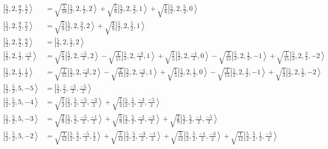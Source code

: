\documentclass{report}
\newcommand{\ket}[1]{\left| #1 \right>} %
\begin{document}
\begin{align*}
\ket{ \frac{5}{2} ,  2 ,  \frac{9}{2} ,  \frac{5}{2}  } &=  \sqrt{  \frac{5}{18}  } \ket{ \frac{5}{2} ,  2 ,  \frac{1}{2} ,  2  } + \sqrt{  \frac{5}{9}  } \ket{ \frac{5}{2} ,  2 ,  \frac{3}{2} ,  1  } + \sqrt{  \frac{1}{6}  } \ket{ \frac{5}{2} ,  2 ,  \frac{5}{2} ,  0  } \\
\ket{ \frac{5}{2} ,  2 ,  \frac{9}{2} ,  \frac{7}{2}  } &=  \sqrt{  \frac{5}{9}  } \ket{ \frac{5}{2} ,  2 ,  \frac{3}{2} ,  2  } + \sqrt{  \frac{4}{9}  } \ket{ \frac{5}{2} ,  2 ,  \frac{5}{2} ,  1  } \\
\ket{ \frac{5}{2} ,  2 ,  \frac{9}{2} ,  \frac{9}{2}  } &=  \ket{ \frac{5}{2} ,  2 ,  \frac{5}{2} ,  2  } \\
\ket{ \frac{5}{2} ,  2 ,  \frac{1}{2} ,  \frac{-1}{2}  } &=  \sqrt{  \frac{1}{3}  } \ket{ \frac{5}{2} ,  2 ,  \frac{-5}{2} ,  2  } - \sqrt{  \frac{4}{15}  } \ket{ \frac{5}{2} ,  2 ,  \frac{-3}{2} ,  1  } + \sqrt{  \frac{1}{5}  } \ket{ \frac{5}{2} ,  2 ,  \frac{-1}{2} ,  0  } - \sqrt{  \frac{2}{15}  } \ket{ \frac{5}{2} ,  2 ,  \frac{1}{2} ,  -1  } + \sqrt{  \frac{1}{15}  } \ket{ \frac{5}{2} ,  2 ,  \frac{3}{2} ,  -2  } \\
\ket{ \frac{5}{2} ,  2 ,  \frac{1}{2} ,  \frac{1}{2}  } &=  \sqrt{  \frac{1}{15}  } \ket{ \frac{5}{2} ,  2 ,  \frac{-3}{2} ,  2  } - \sqrt{  \frac{2}{15}  } \ket{ \frac{5}{2} ,  2 ,  \frac{-1}{2} ,  1  } + \sqrt{  \frac{1}{5}  } \ket{ \frac{5}{2} ,  2 ,  \frac{1}{2} ,  0  } - \sqrt{  \frac{4}{15}  } \ket{ \frac{5}{2} ,  2 ,  \frac{3}{2} ,  -1  } + \sqrt{  \frac{1}{3}  } \ket{ \frac{5}{2} ,  2 ,  \frac{5}{2} ,  -2  } \\
\ket{ \frac{5}{2} ,  \frac{5}{2} ,  5 ,  -5  } &=  \ket{ \frac{5}{2} ,  \frac{5}{2} ,  \frac{-5}{2} ,  \frac{-5}{2}  } \\
\ket{ \frac{5}{2} ,  \frac{5}{2} ,  5 ,  -4  } &=  \sqrt{  \frac{1}{2}  } \ket{ \frac{5}{2} ,  \frac{5}{2} ,  \frac{-5}{2} ,  \frac{-3}{2}  } + \sqrt{  \frac{1}{2}  } \ket{ \frac{5}{2} ,  \frac{5}{2} ,  \frac{-3}{2} ,  \frac{-5}{2}  } \\
\ket{ \frac{5}{2} ,  \frac{5}{2} ,  5 ,  -3  } &=  \sqrt{  \frac{2}{9}  } \ket{ \frac{5}{2} ,  \frac{5}{2} ,  \frac{-5}{2} ,  \frac{-1}{2}  } + \sqrt{  \frac{5}{9}  } \ket{ \frac{5}{2} ,  \frac{5}{2} ,  \frac{-3}{2} ,  \frac{-3}{2}  } + \sqrt{  \frac{2}{9}  } \ket{ \frac{5}{2} ,  \frac{5}{2} ,  \frac{-1}{2} ,  \frac{-5}{2}  } \\
\ket{ \frac{5}{2} ,  \frac{5}{2} ,  5 ,  -2  } &=  \sqrt{  \frac{1}{12}  } \ket{ \frac{5}{2} ,  \frac{5}{2} ,  \frac{-5}{2} ,  \frac{1}{2}  } + \sqrt{  \frac{5}{12}  } \ket{ \frac{5}{2} ,  \frac{5}{2} ,  \frac{-3}{2} ,  \frac{-1}{2}  } + \sqrt{  \frac{5}{12}  } \ket{ \frac{5}{2} ,  \frac{5}{2} ,  \frac{-1}{2} ,  \frac{-3}{2}  } + \sqrt{  \frac{1}{12}  } \ket{ \frac{5}{2} ,  \frac{5}{2} ,  \frac{1}{2} ,  \frac{-5}{2}  } \\

\end{align*}
\end{document}
